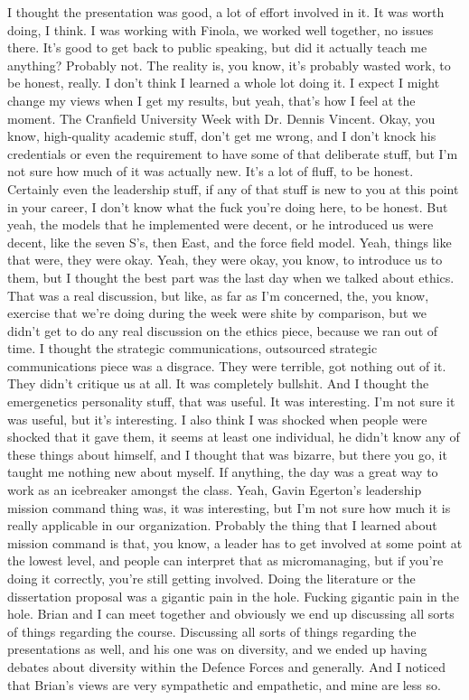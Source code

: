 I thought the presentation was good, a lot of effort involved in it. It was worth doing, I think. I was working with Finola, we worked well together, no issues there. It's good to get back to public speaking, but did it actually teach me anything? Probably not. The reality is, you know, it's probably wasted work, to be honest, really. I don't think I learned a whole lot doing it. I expect I might change my views when I get my results, but yeah, that's how I feel at the moment. The Cranfield University Week with Dr. Dennis Vincent. Okay, you know, high-quality academic stuff, don't get me wrong, and I don't knock his credentials or even the requirement to have some of that deliberate stuff, but I'm not sure how much of it was actually new. It's a lot of fluff, to be honest. Certainly even the leadership stuff, if any of that stuff is new to you at this point in your career, I don't know what the fuck you're doing here, to be honest. But yeah, the models that he implemented were decent, or he introduced us were decent, like the seven S's, then East, and the force field model. Yeah, things like that were, they were okay. Yeah, they were okay, you know, to introduce us to them, but I thought the best part was the last day when we talked about ethics. That was a real discussion, but like, as far as I'm concerned, the, you know, exercise that we're doing during the week were shite by comparison, but we didn't get to do any real discussion on the ethics piece, because we ran out of time. I thought the strategic communications, outsourced strategic communications piece was a disgrace. They were terrible, got nothing out of it. They didn't critique us at all. It was completely bullshit. And I thought the emergenetics personality stuff, that was useful. It was interesting. I'm not sure it was useful, but it's interesting. I also think I was shocked when people were shocked that it gave them, it seems at least one individual, he didn't know any of these things about himself, and I thought that was bizarre, but there you go, it taught me nothing new about myself. If anything, the day was a great way to work as an icebreaker amongst the class. Yeah, Gavin Egerton's leadership mission command thing was, it was interesting, but I'm not sure how much it is really applicable in our organization. Probably the thing that I learned about mission command is that, you know, a leader has to get involved at some point at the lowest level, and people can interpret that as micromanaging, but if you're doing it correctly, you're still getting involved. Doing the literature or the dissertation proposal was a gigantic pain in the hole. Fucking gigantic pain in the hole. Brian and I can meet together and obviously we end up discussing all sorts of things regarding the course. Discussing all sorts of things regarding the presentations as well, and his one was on diversity, and we ended up having debates about diversity within the Defence Forces and generally. And I noticed that Brian's views are very sympathetic and empathetic, and mine are less so.